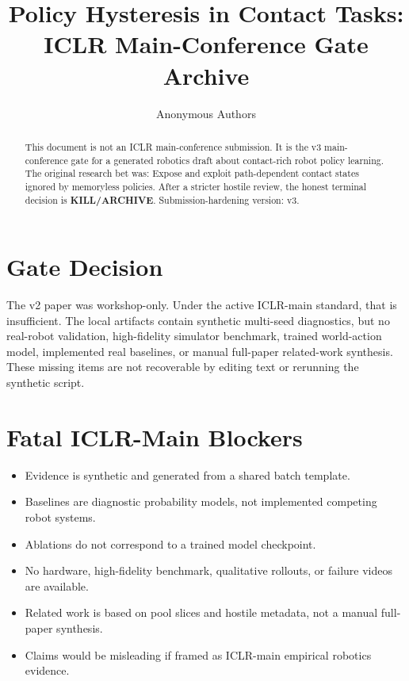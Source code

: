 \documentclass{article}
\title{Policy Hysteresis in Contact Tasks: ICLR Main-Conference Gate Archive}
\author{Anonymous Authors}
\begin{document}
\maketitle
\begin{abstract}
This document is not an ICLR main-conference submission. It is the v3 main-conference gate for a generated robotics draft about contact-rich robot policy learning. The original research bet was: Expose and exploit path-dependent contact states ignored by memoryless policies. After a stricter hostile review, the honest terminal decision is \textbf{KILL/ARCHIVE}. Submission-hardening version: v3.
\end{abstract}

\section{Gate Decision}
The v2 paper was workshop-only. Under the active ICLR-main standard, that is insufficient. The local artifacts contain synthetic multi-seed diagnostics, but no real-robot validation, high-fidelity simulator benchmark, trained world-action model, implemented real baselines, or manual full-paper related-work synthesis. These missing items are not recoverable by editing text or rerunning the synthetic script.

\section{Fatal ICLR-Main Blockers}
\begin{itemize}
\item Evidence is synthetic and generated from a shared batch template.
\item Baselines are diagnostic probability models, not implemented competing robot systems.
\item Ablations do not correspond to a trained model checkpoint.
\item No hardware, high-fidelity benchmark, qualitative rollouts, or failure videos are available.
\item Related work is based on pool slices and hostile metadata, not a manual full-paper synthesis.
\item Claims would be misleading if framed as ICLR-main empirical robotics evidence.
\end{itemize}
\end{document}
